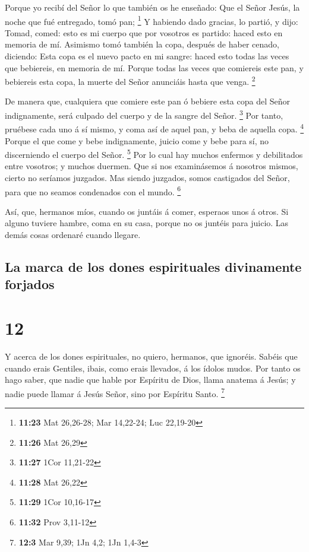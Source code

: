 Porque yo recibí del Señor lo que también os he enseñado:
Que el Señor Jesús, la noche que fué entregado, tomó pan; \footnote{\textbf{11:23}
  Mat 26,26-28; Mar 14,22-24; Luc 22,19-20}  Y habiendo
dado gracias, lo partió, y dijo: Tomad, comed: esto es mi cuerpo que por
vosotros es partido: haced esto en memoria de mí.  Asimismo
tomó también la copa, después de haber cenado, diciendo: Esta copa es el
nuevo pacto en mi sangre: haced esto todas las veces que bebiereis, en
memoria de mí.  Porque todas las veces que comiereis este
pan, y bebiereis esta copa, la muerte del Señor anunciáis hasta que
venga. \footnote{\textbf{11:26} Mat 26,29}

 De manera que, cualquiera que comiere este pan ó bebiere
esta copa del Señor indignamente, será culpado del cuerpo y de la sangre
del Señor. \footnote{\textbf{11:27} 1Cor 11,21-22}  Por
tanto, pruébese cada uno á sí mismo, y coma así de aquel pan, y beba de
aquella copa. \footnote{\textbf{11:28} Mat 26,22}  Porque
el que come y bebe indignamente, juicio come y bebe para sí, no
discerniendo el cuerpo del Señor. \footnote{\textbf{11:29} 1Cor 10,16-17}
 Por lo cual hay muchos enfermos y debilitados entre
vosotros; y muchos duermen.  Que si nos examinásemos á
nosotros mismos, cierto no seríamos juzgados.  Mas siendo
juzgados, somos castigados del Señor, para que no seamos condenados con
el mundo. \footnote{\textbf{11:32} Prov 3,11-12}

 Así, que, hermanos míos, cuando os juntáis á comer,
esperaos unos á otros.  Si alguno tuviere hambre, coma en
su casa, porque no os juntéis para juicio. Las demás cosas ordenaré
cuando llegare.

\hypertarget{la-marca-de-los-dones-espirituales-divinamente-forjados}{%
\subsection{La marca de los dones espirituales divinamente
forjados}\label{la-marca-de-los-dones-espirituales-divinamente-forjados}}

\hypertarget{section-11}{%
\section{12}\label{section-11}}

 Y acerca de los dones espirituales, no quiero, hermanos,
que ignoréis.  Sabéis que cuando erais Gentiles, ibais, como
erais llevados, á los ídolos mudos.  Por tanto os hago
saber, que nadie que hable por Espíritu de Dios, llama anatema á Jesús;
y nadie puede llamar á Jesús Señor, sino por Espíritu Santo. \footnote{\textbf{12:3}
  Mar 9,39; 1Jn 4,2; 1Jn 1,4-3}

